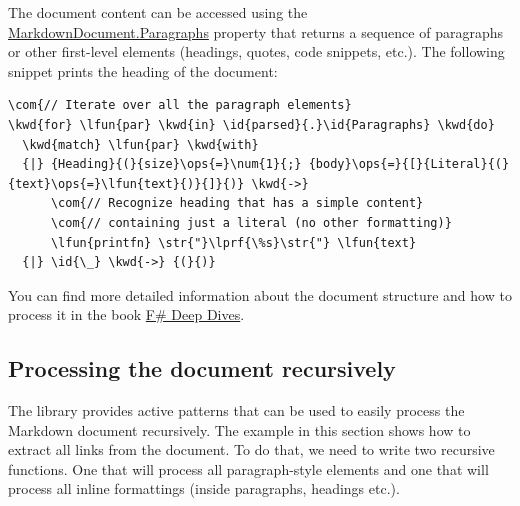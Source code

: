 \documentclass{article}
\newcommand{\id}[1]{\textcolor{black}{#1}}
\newcommand{\com}[1]{\textcolor{officegreen}{#1}}
\newcommand{\kwd}[1]{\textcolor{navy}{#1}}
\newcommand{\num}[1]{\textcolor{officegreen}{#1}}
\newcommand{\ops}[1]{\textcolor{purple}{#1}}
\newcommand{\str}[1]{\textcolor{olive}{#1}}
\begin{document}
The document content can be accessed using the \href{https://fsprojects.github.io/FSharp.Formatting/reference/fsharp-formatting-markdown-markdowndocument.html\#Paragraphs}{MarkdownDocument.Paragraphs} property that returns
a sequence of paragraphs or other first-level elements (headings, quotes, code snippets, etc.).
The following snippet prints the heading of the document:
\begin{Verbatim}[commandchars=\\\{\}]
\com{// Iterate over all the paragraph elements}
\kwd{for} \lfun{par} \kwd{in} \id{parsed}{.}\id{Paragraphs} \kwd{do}
  \kwd{match} \lfun{par} \kwd{with}
  {|} {Heading}{(}{size}\ops{=}\num{1}{;} {body}\ops{=}{[}{Literal}{(}{text}\ops{=}\lfun{text}{)}{]}{)} \kwd{->}
      \com{// Recognize heading that has a simple content}
      \com{// containing just a literal (no other formatting)}
      \lfun{printfn} \str{"}\lprf{\%s}\str{"} \lfun{text}
  {|} \id{\_} \kwd{->} {(}{)}
\end{Verbatim}



You can find more detailed information about the document structure and how to process it
in the book \href{http://manning.com/petricek2/}{F\# Deep Dives}.
\subsection*{Processing the document recursively}



The library provides active patterns that can be used to easily process the Markdown
document recursively. The example in this section shows how to extract all links from the
document. To do that, we need to write two recursive functions. One that will process
all paragraph-style elements and one that will process all inline formattings (inside
paragraphs, headings etc.).
\end{document}
